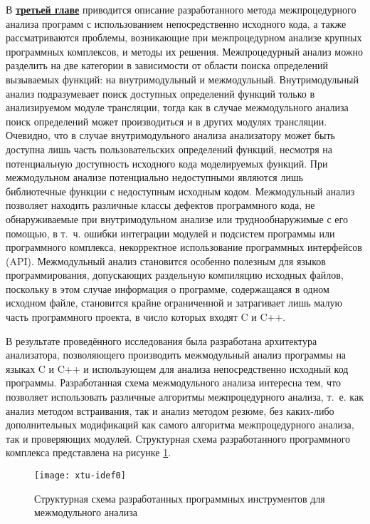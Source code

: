 В \underline{\textbf{третьей главе}} приводится описание разработанного метода межпроцедурного анализа программ с использованием непосредственно исходного кода, а также рассматриваются проблемы, возникающие при межпроцедурном анализе крупных программных комплексов, и методы их решения. Межпроцедурный анализ можно разделить на две категории в зависимости от области поиска определений вызываемых функций: на внутримодульный и межмодульный. Внутримодульный анализ подразумевает поиск доступных определений функций только в анализируемом модуле трансляции, тогда как в случае межмодульного анализа поиск определений может производиться и в других модулях трансляции. Очевидно, что в случае внутримодульного анализа анализатору может быть доступна лишь часть пользовательских определений функций, несмотря на потенциальную доступность исходного  кода моделируемых функций. При межмодульном анализе потенциально недоступными являются лишь библиотечные функции с недоступным исходным кодом. Межмодульный анализ позволяет находить различные классы дефектов программного кода, не обнаруживаемые при внутримодульном анализе или труднообнаружимые с его помощью, в т.~ч. ошибки интеграции модулей и подсистем программы или программного комплекса, некорректное использование программных интерфейсов (API). Межмодульный анализ становится особенно полезным для языков программирования, допускающих раздельную компиляцию исходных файлов, поскольку в этом случае информация о программе, содержащаяся в одном исходном файле, становится крайне ограниченной и затрагивает лишь малую часть программного проекта, в число которых входят C и C++.

В результате проведённого исследования была разработана архитектура анализатора, позволяющего производить межмодульный анализ программы на языках C и C++ и использующем для анализа непосредственно исходный код программы. Разработанная схема межмодульного анализа интересна тем, что позволяет использовать различные алгоритмы межпроцедурного анализа, т.~е. как анализ методом встраивания, так и анализ методом резюме, без каких-либо дополнительных модификаций как самого алгоритма межпроцедурного анализа, так и проверяющих модулей. Структурная схема разработанного программного комплекса представлена на рисунке \ref{xtu-idef0}.

\begin{figure}[h]
 \label{}
 \centering
 \texttt{[image: xtu-idef0]}
 \caption{Структурная схема разработанных программных инструментов для межмодульного анализа}\label{xtu-idef0}
\end{figure}


